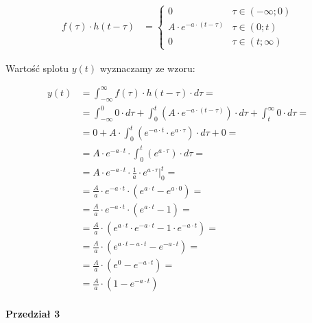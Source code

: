 \begin{task}
\begin{figure}[H]
\begin{animateinline}[controls,autoplay,loop,poster = 10]{10}
{  
		}
	\end{animateinline}
\end{figure}


\begin{align*}
f(\tau) \cdot h(t-\tau)&=\begin{cases}
0 & \tau \in \left(-\infty; 0\right)\\
A \cdot e^{-a \cdot (t-\tau)} & \tau \in \left(0; t\right)\\
0 & \tau \in \left( t; \infty \right)
\end{cases}
\end{align*}

Wartość splotu $y(t)$ wyznaczamy ze wzoru:

\begin{align*}
y(t)&=\int_{-\infty}^{\infty} f(\tau) \cdot h(t-\tau) \cdot d\tau=\\
&=\int_{-\infty}^{0} 0 \cdot d\tau + \int_{0}^{t}\left(A \cdot e^{-a \cdot (t-\tau)}\right)\cdot d\tau +\int_{t}^{\infty} 0 \cdot d\tau=\\
&=0 + A \cdot \int_{0}^{t}\left(e^{-a \cdot t}\cdot e^{a \cdot \tau}\right)\cdot d\tau +0=\\
&=A \cdot e^{-a \cdot t} \cdot \int_{0}^{t}\left(e^{a \cdot \tau}\right)\cdot d\tau=\\
&=A \cdot e^{-a \cdot t} \cdot \frac{1}{a} \cdot \left.e^{a \cdot \tau}\right|_{0}^{t}=\\
&=\frac{A}{a} \cdot e^{-a \cdot t} \cdot \left(e^{a \cdot t} - e^{a \cdot 0} \right)=\\
&=\frac{A}{a} \cdot e^{-a \cdot t} \cdot \left(e^{a \cdot t} - 1 \right)=\\
&=\frac{A}{a} \cdot \left(e^{a \cdot t} \cdot e^{-a \cdot t} - 1 \cdot e^{-a \cdot t}\right)=\\
&=\frac{A}{a} \cdot \left(e^{a \cdot t -a \cdot t} - e^{-a \cdot t}\right)=\\
&=\frac{A}{a} \cdot \left(e^{0} - e^{-a \cdot t}\right)=\\
&=\frac{A}{a} \cdot \left(1 - e^{-a \cdot t}\right)
\end{align*}

\paragraph{Przedział 3}


\end{task}

